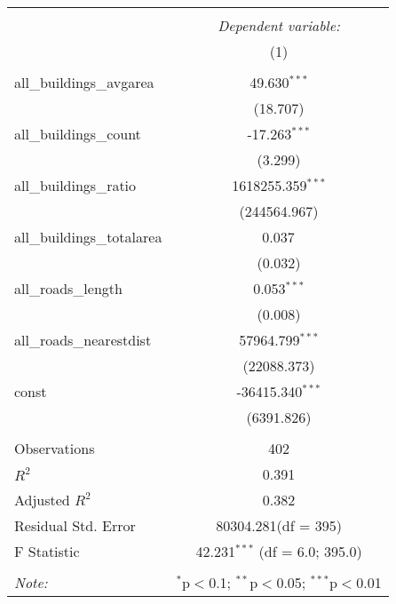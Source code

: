 \begin{table}[!htbp] \centering
\begin{tabular}{@{\extracolsep{5pt}}lc}
\\[-1.8ex]\hline
\hline \\[-1.8ex]
& \multicolumn{1}{c}{\textit{Dependent variable:}} \
\cr \cline{1-2}
\\[-1.8ex] & (1) \\
\hline \\[-1.8ex]
 all_buildings_avgarea & 49.630$^{***}$ \\
  & (18.707) \\
 all_buildings_count & -17.263$^{***}$ \\
  & (3.299) \\
 all_buildings_ratio & 1618255.359$^{***}$ \\
  & (244564.967) \\
 all_buildings_totalarea & 0.037$^{}$ \\
  & (0.032) \\
 all_roads_length & 0.053$^{***}$ \\
  & (0.008) \\
 all_roads_nearestdist & 57964.799$^{***}$ \\
  & (22088.373) \\
 const & -36415.340$^{***}$ \\
  & (6391.826) \\
\hline \\[-1.8ex]
 Observations & 402 \\
 $R^2$ & 0.391 \\
 Adjusted $R^2$ & 0.382 \\
 Residual Std. Error & 80304.281(df = 395)  \\
 F Statistic & 42.231$^{***}$ (df = 6.0; 395.0) \\
\hline
\hline \\[-1.8ex]
\textit{Note:} & \multicolumn{1}{r}{$^{*}$p$<$0.1; $^{**}$p$<$0.05; $^{***}$p$<$0.01} \\
\end{tabular}
\end{table}